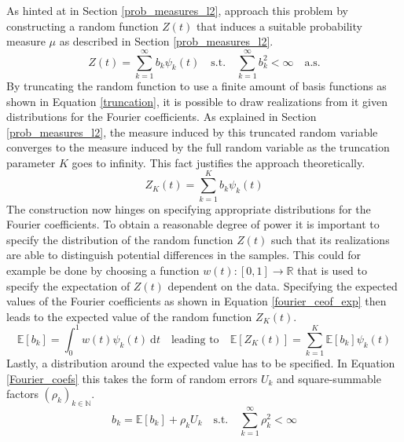\documentclass[12pt, a4paper]{article}
\theoremstyle{MAstyle} \newtheorem{assumption}{Assumption}[section]
\theoremstyle{MAstyle} \newtheorem{definition}{Definition}[section]
\theoremstyle{MAstyle} \newtheorem{theorem}{Theorem}[section]
\begin{document}
			As hinted at in Section \ref{prob_measures_l2}, \cite{bugni_permutation_2021} approach this problem by constructing a random function $Z(t)$ that induces a suitable probability measure $\mu$ as described in Section \ref{prob_measures_l2}. 			
			\begin{equation}\label{non_truncated}
				Z(t) = \sum_{k = 1}^{\infty} b_k \psi_k(t)
				\quad \text{s.t.} \quad
				\sum_{k = 1}^{\infty} b_k^2 < \infty \quad \text{a.s.}
			\end{equation}
			By truncating the random function to use a finite amount of basis functions as shown in Equation \ref{truncation}, it is possible to draw realizations from it given distributions for the  Fourier coefficients. As explained in Section \ref{prob_measures_l2}, the measure induced by this truncated random variable converges to the measure induced by the full random variable as the truncation parameter $K$ goes to infinity. This fact justifies the approach theoretically.
			\begin{equation}\label{truncation}
				Z_K(t) = \sum_{k = 1}^{K} b_k \psi_k(t)
			\end{equation}
			The construction now hinges on specifying appropriate distributions for the Fourier coefficients. To obtain a reasonable degree of power it is important to specify the distribution of the random function $Z(t)$ such that its realizations are able to distinguish potential differences in the samples. This could for example be done by choosing a function $w(t):[0,1] \rightarrow \mathbb{R}$ that is used to specify the expectation of $Z(t)$ dependent on the data. 
			Specifying the expected values of the Fourier coefficients as shown in Equation \ref{fourier_ceof_exp} then leads to the expected value of the random function $Z_K(t)$.
			\begin{equation}\label{fourier_ceof_exp}
				\mathbb{E}\left[b_k\right] = \int_{0}^{1}w(t)\psi_k(t) \ \mathrm{d}t
				\quad \text{leading to} \quad
				\mathbb{E}\left[Z_K(t)\right] = \sum_{k = 1}^{K} \mathbb{E}\left[b_k\right] \psi_k(t)
			\end{equation}
			Lastly, a distribution around the expected value has to be specified. In Equation \ref{Fourier_coefs} this takes the form of random errors $U_k$ and square-summable factors $(\rho_k)_{k \in \mathbb{N}}$.
			\begin{equation}\label{Fourier_coefs}
				b_k = \mathbb{E}\left[b_k\right] + \rho_k U_k
				\quad \text{s.t.} \quad
				\sum_{k = 1}^{\infty} \rho_k^2 < \infty 
			\end{equation}
\end{document}
